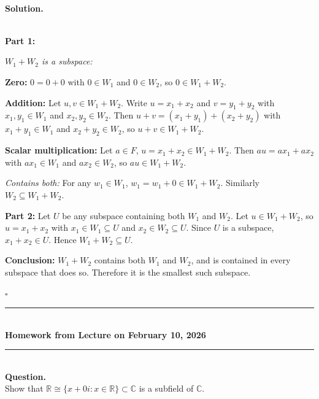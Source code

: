 \documentclass{article}
\begin{document}
\noindent\\
\textbf{Solution.}\\
\quad\\
\begin{mdframed}[linewidth=1pt]
\textbf{Part 1:}

\textit{$W_1 + W_2$ is a subspace:}

\textbf{Zero:} $0 = 0 + 0$ with $0 \in W_1$ and $0 \in W_2$, so $0 \in W_1 + W_2$.

\textbf{Addition:} Let $u, v \in W_1 + W_2$. Write $u = x_1 + x_2$ and $v = y_1 + y_2$ with $x_1, y_1 \in W_1$ and $x_2, y_2 \in W_2$. Then $u + v = (x_1 + y_1) + (x_2 + y_2)$ with $x_1 + y_1 \in W_1$ and $x_2 + y_2 \in W_2$, so $u + v \in W_1 + W_2$.

\textbf{Scalar multiplication:} Let $a \in F$, $u = x_1 + x_2 \in W_1 + W_2$. Then $au = ax_1 + ax_2$ with $ax_1 \in W_1$ and $ax_2 \in W_2$, so $au \in W_1 + W_2$.

\textit{Contains both:} For any $w_1 \in W_1$, $w_1 = w_1 + 0 \in W_1 + W_2$. Similarly $W_2 \subseteq W_1 + W_2$.

\textbf{Part 2:} Let $U$ be any subspace containing both $W_1$ and $W_2$. Let $u \in W_1 + W_2$, so $u = x_1 + x_2$ with $x_1 \in W_1 \subseteq U$ and $x_2 \in W_2 \subseteq U$. Since $U$ is a subspace, $x_1 + x_2 \in U$. Hence $W_1 + W_2 \subseteq U$.

\textbf{Conclusion:} $W_1 + W_2$ contains both $W_1$ and $W_2$, and is contained in every subspace that does so. Therefore it is the smallest such subspace.

\hfill $\square$
\end{mdframed}

\bigskip
\begin{center}
\rule{0.5\textwidth}{1pt}\\[6pt]
\textbf{Homework from Lecture on February 10, 2026}\\[2pt]
\rule{0.5\textwidth}{1pt}
\end{center}
\bigskip

\hfill \break  $~\!\!$ \dotfill \medskip \\
\textbf{Question.}\\
Show that $\mathbb{R} \cong \{x + 0i : x \in \mathbb{R}\} \subset \mathbb{C}$ is a subfield of $\mathbb{C}$.
\end{document}
